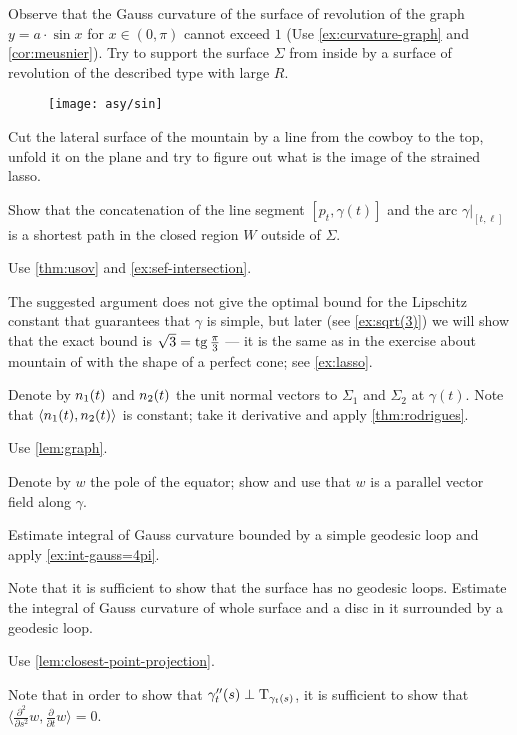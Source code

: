 Observe that the Gauss curvature of the surface of revolution of the graph $y=a\cdot \sin x$ for $x\in(0,\pi)$ cannot exceed $1$ (Use \ref{ex:curvature-graph} and \ref{cor:meusnier}).
Try to support the surface $\Sigma$ from inside by a surface of revolution of the described type with large $R$. 

\begin{figure}[h!]
\vskip-0mm
\centering
\texttt{[image: asy/sin]}
\vskip-0mm
\end{figure}

 Cut the lateral surface of the mountain by a line from the cowboy to the top, unfold it on the plane and try to figure out what is the image of the strained lasso.

 Show that the concatenation of the line segment $[p_t,\gamma(t)]$ and the arc $\gamma|_{[t,\ell]}$ is a shortest path in the closed region $W$ outside of $\Sigma$.

 Use \ref{thm:usov} and \ref{ex:sef-intersection}.

The suggested argument does not give the optimal bound for the Lipschitz constant that guarantees that $\gamma$ is simple, but
later (see \ref{ex:sqrt(3)}) we will show that the exact bound is $\sqrt{3}=\operatorname{tg}\tfrac\pi3$ --- it is the same as in the exercise about mountain of with the shape of a perfect cone; see \ref{ex:lasso}.

  Denote by $n_1(t)$ and $n_2(t)$ the unit normal vectors to $\Sigma_1$ and $\Sigma_2$ at $\gamma(t)$.
Note that $\langle n_1(t),n_2(t)\rangle$ is constant; take it derivative and apply \ref{thm:rodrigues}.

 Use \ref{lem:graph}.

 Denote by $w$ the pole of the equator; show and use that $w$ is a parallel vector field along $\gamma$.

 Estimate integral of Gauss curvature bounded by a simple geodesic loop and apply \ref{ex:int-gauss=4pi}.

 Note that it is sufficient to show that the surface has no geodesic loops.
Estimate the integral of Gauss curvature of whole surface and a disc in it surrounded by a geodesic loop.



 Use \ref{lem:closest-point-projection}.



 Note that in order to show that $\gamma''_t(s)\perp\mathrm{T}_{\gamma_t(s)}$, it is sufficient to show that $\langle\tfrac{\partial^2}{\partial s^2}w,\tfrac{\partial}{\partial t}w\rangle=0$.






